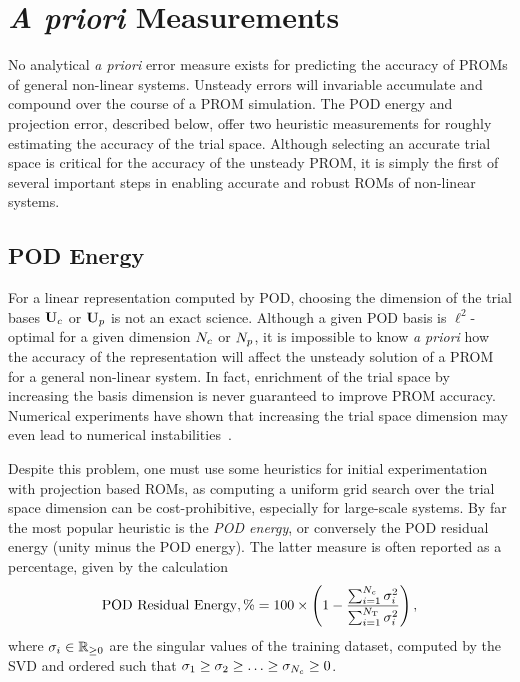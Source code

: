 \section{\textit{A priori} Measurements}

No analytical \textit{a priori} error measure exists for predicting the accuracy of PROMs of general non-linear systems. Unsteady errors will invariable accumulate and compound over the course of a PROM simulation. The POD energy and projection error, described below, offer two heuristic measurements for roughly estimating the accuracy of the trial space. Although selecting an accurate trial space is critical for the accuracy of the unsteady PROM, it is simply the first of several important steps in enabling accurate and robust ROMs of non-linear systems.

\subsection{POD Energy}

For a linear representation computed by POD, choosing the dimension of the trial bases $\consTrial$ or $\primTrial$ is not an exact science. Although a given POD basis is $\ell^2$-optimal for a given dimension $N_c$ or $N_p$, it is impossible to know \textit{a priori} how the accuracy of the representation will affect the unsteady solution of a PROM for a general non-linear system. In fact, enrichment of the trial space by increasing the basis dimension is never guaranteed to improve PROM accuracy. Numerical experiments have shown that increasing the trial space dimension may even lead to numerical instabilities~\cite{Huang2022}.

Despite this problem, one must use some heuristics for initial experimentation with projection based ROMs, as computing a uniform grid search over the trial space dimension can be cost-prohibitive, especially for large-scale systems. By far the most popular heuristic is the \textit{POD energy}, or conversely the POD residual energy (unity minus the POD energy). The latter measure is often reported as a percentage, given by the calculation
%
\begin{equation}\label{eq:podEnergyResidual}
    \text{POD Residual Energy}, \% = 100 \times \left( 1 - \frac{\sum_{i=1}^{N_c} \sigma_{i}^2}{\sum_{i=1}^{N_{\text{T}}} \sigma_{i}^2} \right),
\end{equation}
%
where $\sigma_{i} \in \mathbb{R}_{\ge 0}$ are the singular values of the training dataset, computed by the SVD and ordered such that $\sigma_1 \ge \sigma_2 \ge \hdots \ge \sigma_{N_c} \ge 0$.

